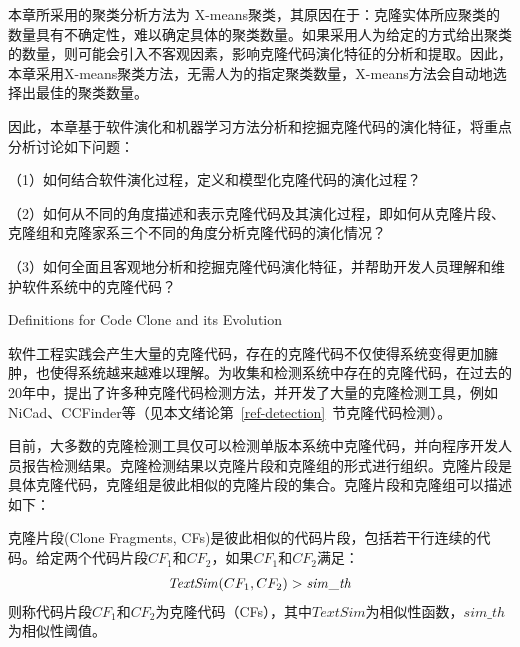 本章所采用的聚类分析方法为 X-means\cite{pelleg2000x}聚类，其原因在于：克隆实体所应聚类的数量具有不确定性，难以确定具体的聚类数量。如果采用人为给定的方式给出聚类的数量，则可能会引入不客观因素，影响克隆代码演化特征的分析和提取。因此，本章采用X-means聚类方法，无需人为的指定聚类数量，X-means方法会自动地选择出最佳的聚类数量。

因此，本章基于软件演化和机器学习方法分析和挖掘克隆代码的演化特征，将重点分析讨论如下问题：

（1）如何结合软件演化过程，定义和模型化克隆代码的演化过程？

（2）如何从不同的角度描述和表示克隆代码及其演化过程，即如何从克隆片段、克隆组和克隆家系三个不同的角度分析克隆代码的演化情况？

（3）如何全面且客观地分析和挖掘克隆代码演化特征，并帮助开发人员理解和维护软件系统中的克隆代码？%

{Definitions for Code Clone and its Evolution}
\label{lab-evolution}

软件工程实践会产生大量的克隆代码，存在的克隆代码不仅使得系统变得更加臃肿，也使得系统越来越难以理解。为收集和检测系统中存在的克隆代码，在过去的20年中，提出了许多种克隆代码检测方法，并开发了大量的克隆检测工具，例如NiCad\cite{roy2008nicad}、CCFinder\cite{kamiya2002ccfinder}等（见本文绪论第~\ref{ref-detection}~节克隆代码检测）。

目前，大多数的克隆检测工具仅可以检测单版本系统中克隆代码，并向程序开发人员报告检测结果。克隆检测结果以克隆片段和克隆组的形式进行组织。克隆片段是具体克隆代码，克隆组是彼此相似的克隆片段的集合。克隆片段和克隆组可以描述如下：

\begin{definition}[克隆片段]
\label{defn-clonefragment}
克隆片段(Clone Fragments, CFs)是彼此相似的代码片段，包括若干行连续的代码。给定两个代码片段$CF_1$和$CF_2$，如果$CF_1$和$CF_2$满足：
\begin{equation} 
  \begin{array}[t]{c}
    \mathit{TextSim}(CF_1, CF_2) > \mathit{sim\_th} \\
  \end{array}
\end{equation} 
则称代码片段$CF_1$和$CF_2$为克隆代码（CFs），其中$\mathit{TextSim}$为相似性函数，$\mathit{sim\_th}$为相似性阈值。
\end{definition}

